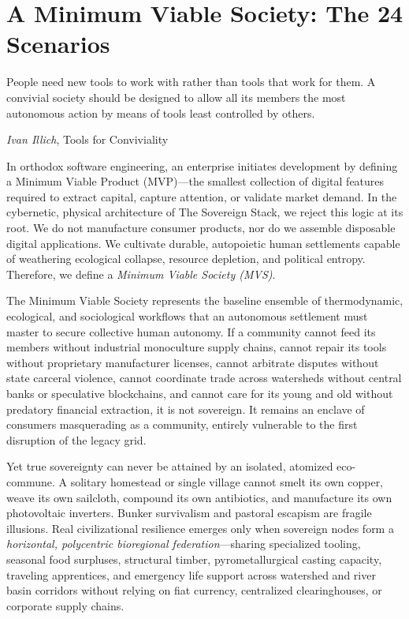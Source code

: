 \chapter{A Minimum Viable Society: The 24 Scenarios}

\epigraph{People need new tools to work with rather than tools that work for them. A convivial society should be designed to allow all its members the most autonomous action by means of tools least controlled by others.}{\textit{Ivan Illich}, \textnormal{Tools for Conviviality} \parencite{illich1973}}

In orthodox software engineering, an enterprise initiates development by defining a Minimum Viable Product (MVP)---the smallest collection of digital features required to extract capital, capture attention, or validate market demand. In the cybernetic, physical architecture of The Sovereign Stack, we reject this logic at its root. We do not manufacture consumer products, nor do we assemble disposable digital applications. We cultivate durable, autopoietic human settlements capable of weathering ecological collapse, resource depletion, and political entropy. Therefore, we define a \textit{Minimum Viable Society (MVS)}.

The Minimum Viable Society represents the baseline ensemble of thermodynamic, ecological, and sociological workflows that an autonomous settlement must master to secure collective human autonomy. If a community cannot feed its members without industrial monoculture supply chains, cannot repair its tools without proprietary manufacturer licenses, cannot arbitrate disputes without state carceral violence, cannot coordinate trade across watersheds without central banks or speculative blockchains, and cannot care for its young and old without predatory financial extraction, it is not sovereign. It remains an enclave of consumers masquerading as a community, entirely vulnerable to the first disruption of the legacy grid.

Yet true sovereignty can never be attained by an isolated, atomized eco-commune. A solitary homestead or single village cannot smelt its own copper, weave its own sailcloth, compound its own antibiotics, and manufacture its own photovoltaic inverters. Bunker survivalism and pastoral escapism are fragile illusions. Real civilizational resilience emerges only when sovereign nodes form a \textit{horizontal, polycentric bioregional federation}---sharing specialized tooling, seasonal food surpluses, structural timber, pyrometallurgical casting capacity, traveling apprentices, and emergency life support across watershed and river basin corridors without relying on fiat currency, centralized clearinghouses, or corporate supply chains.

